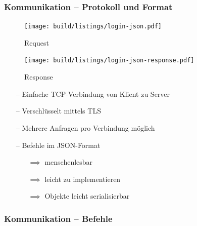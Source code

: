 \documentclass[aspectratio=1610]{beamer}
\begin{document}
    \begin{frame}[plain]
        \frametitle{\textbf{Kommunikation} -- Protokoll und Format}
        \begin{minipage}{0.5\textwidth}
            \begin{figure}
                \texttt{[image: build/listings/login-json.pdf]}
                \caption{Request}
            \end{figure}
            \begin{figure}
                \texttt{[image: build/listings/login-json-response.pdf]}
                \caption{Response}
            \end{figure}
        \end{minipage}%
        \begin{minipage}{0.5\textwidth}
            \begin{itemize}
                \item[--] Einfache TCP-Verbindung von Klient zu Server
                \item[--] Verschlüsselt mittels TLS
                \item[--] Mehrere Anfragen pro Verbindung möglich
                \item[--] Befehle im JSON-Format
                    \begin{itemize}
                        \item[$\implies$] menschenlesbar
                        \item[$\implies$] leicht zu implementieren
                        \item[$\implies$] Objekte leicht serialisierbar
                    \end{itemize}
            \end{itemize}
        \end{minipage}
	\end{frame}

    \begin{frame}[plain]
        \frametitle{\textbf{Kommunikation} -- Befehle}
	\end{frame}
\end{document}
